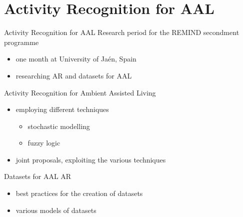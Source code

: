 
\section{Activity Recognition for AAL}
  \begin{frame}{Activity Recognition for AAL}
    Research period for the REMIND secondment programme
    \begin{itemize}
      \item one month at University of Jaén, Spain
      \item researching AR and datasets for AAL
    \end{itemize}
  
    \vspace{1em}
    Activity Recognition for Ambient Assisted Living
    \begin{itemize}
      \item employing different techniques
      \begin{itemize}
        \item stochastic modelling
        \item fuzzy logic
      \end{itemize}
      \item joint proposals, exploiting the various techniques
    \end{itemize}
    
    \vspace{1em}
    Datasets for AAL AR
    \begin{itemize}
      \item best practices for the creation of datasets
      \item various models of datasets
    \end{itemize}
  \end{frame}